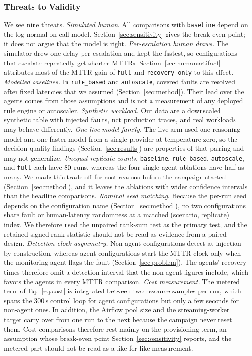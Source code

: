 \subsubsection{Threats to Validity}
We see nine threats. \emph{Simulated human.} All comparisons with \texttt{baseline} depend on the
log-normal on-call model. Section~\ref{sec:sensitivity} gives the break-even point; it does not argue
that the model is right. \emph{Per-escalation human draws.} The simulator drew one delay per
escalation and kept the fastest, so configurations that escalate repeatedly get shorter MTTRs.
Section~\ref{sec:humanartifact} attributes most of the MTTR gain of \texttt{full} and
\texttt{recovery\_only} to this effect. \emph{Modelled baselines.} In \texttt{rule\_based} and \texttt{autoscale},
covered faults are resolved after fixed latencies that we assumed (Section~\ref{sec:method}). Their
lead over the agents comes from those assumptions and is not a measurement of any deployed rule engine
or autoscaler. \emph{Synthetic workload.} Our data are a downscaled synthetic table with injected
faults, not production traces, and real workloads may behave differently. \emph{One live model
family.} The live arm used one reasoning model and one faster model
from a single provider at temperature zero, so the decision-quality findings
(Section~\ref{sec:results}) are properties of that pairing and may not generalize. \emph{Unequal
replicate counts.} \texttt{baseline}, \texttt{rule\_based}, \texttt{autoscale}, and \texttt{full} each
have $80{}$ runs, whereas the four single-agent ablations have half as many. We made this
trade-off for cost reasons before the campaign started (Section~\ref{sec:method}), and it leaves the
ablations with wider confidence intervals than the headline comparisons. \emph{Nominal seed matching.} Because the per-run
seed depends on the configuration name (Section~\ref{sec:method}), no two configurations share fault
or human-latency randomness at a matched (scenario, replicate) index. We therefore used the unpaired
rank-sum test as the primary test, and the retained signed-rank statistic should not be read as
evidence from a paired design. \emph{Detection-clock asymmetry.} Non-agent configurations detect at
injection by construction, whereas agent configurations start the MTTR clock only when the monitoring
agent flags the fault (Section~\ref{sec:problem}). The agents' recovery times therefore omit a
detection interval that the non-agent figures include, which favors the agents in every MTTR
comparison. \emph{Cost measurement.} The metered term of Eq.~\eqref{eq:cost} is integrated between two
resource samples per run, which spans the 300\,s control loop for agent configurations but only a few
seconds for non-agent ones. In addition, the Airflow pool size and the streaming-worker target carry
over from one run to the next because the campaign never reset them. Cost comparisons therefore rest
mainly on the provisioning term, an assumption whose break-even point Section~\ref{sec:sensitivity}
reports, and the metered part should not be read as a like-for-like measurement.

